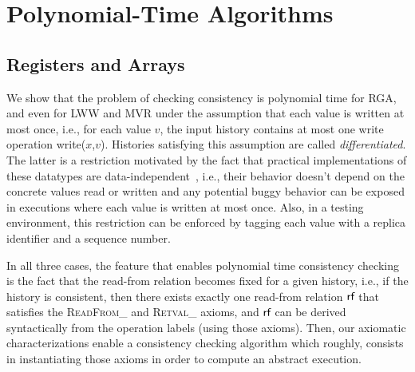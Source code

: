 
\section{Polynomial-Time Algorithms}
\label{sec:algorithms}
\subsection{Registers and Arrays}
\label{sec:registers_array}

We show that the problem of checking consistency is polynomial time for RGA, and even for LWW and MVR under the assumption that each value is written at most once, i.e., for each value $v$, the input history contains at most one write operation {\sf write}($x$,$v$). Histories satisfying this assumption are called \emph{differentiated}. The latter is a restriction motivated by the fact that practical implementations of these datatypes are data-independent~\cite{DBLP:conf/popl/Wolper86}, i.e., their behavior doesn't depend on the concrete values read or written and any potential buggy behavior can be exposed in executions where each value is written at most once. Also, in a testing environment, this restriction can be enforced by tagging each value with a replica identifier and a sequence number.

In all three cases, the feature that enables polynomial time consistency checking is the fact that the read-from relation becomes fixed for a given history, i.e., if the history is consistent, then there exists exactly one read-from relation $\textsf{rf}$ that satisfies the \textsc{ReadFrom\_} and \textsc{Retval\_} axioms, and $\textsf{rf}$ can be derived syntactically from the operation labels (using those axioms). Then, our axiomatic characterizations enable a consistency checking algorithm which roughly, consists in instantiating those axioms in order to compute an abstract execution.

\begin{algorithm}[t]
  {\footnotesize}
  \caption{Consistency checking for RGA, LWW, and MVR. \textsc{Re\ldots}[$T$] refers to an axiom of $T$, or $\mathit{true}$ when $T$ lacks such an axiom. The relation $R^+$ denotes the transitive closure of $R$.
\vspace{-1.5em}
 }
  \label{algo:common}
\end{algorithm}

